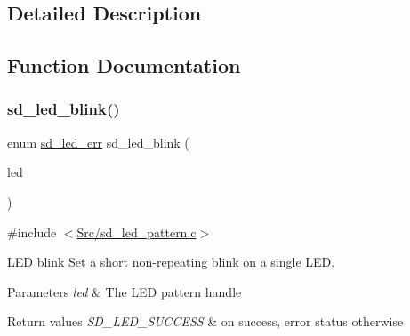 \subsection{Detailed Description}


\subsection{Function Documentation}
\mbox{\label{group___s_d___l_e_d___pattern___functions_gad84b42b641e89723047588e46dcec709}} 
\subsubsection{\texorpdfstring{sd\+\_\+led\+\_\+blink()}{sd\_led\_blink()}}
{\footnotesize\ttfamily enum \mbox{\hyperlink{group___s_d___l_e_d___types_ga4f347a1003b4089de88a7f0fc62c1071}{sd\+\_\+led\+\_\+err}} sd\+\_\+led\+\_\+blink (\begin{DoxyParamCaption}\item[{struct \mbox{\hyperlink{structsd__led}{sd\+\_\+led}} $\ast$}]{led }\end{DoxyParamCaption})}



{\ttfamily \#include $<$\mbox{\hyperlink{sd__led__pattern_8c}{Src/sd\+\_\+led\+\_\+pattern.\+c}}$>$}



L\+ED blink Set a short non-\/repeating blink on a single L\+ED. 


\begin{DoxyParams}{Parameters}
{\em led} & The L\+ED pattern handle \\
\hline
\end{DoxyParams}

\begin{DoxyRetVals}{Return values}
{\em S\+D\+\_\+\+L\+E\+D\+\_\+\+S\+U\+C\+C\+E\+SS} & on success, error status otherwise \\
\hline
\end{DoxyRetVals}

